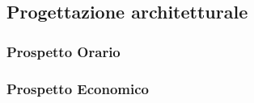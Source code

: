 \subsection{Progettazione architetturale}

\subsubsection{Prospetto Orario}

\subsubsection{Prospetto Economico}

\pagebreak